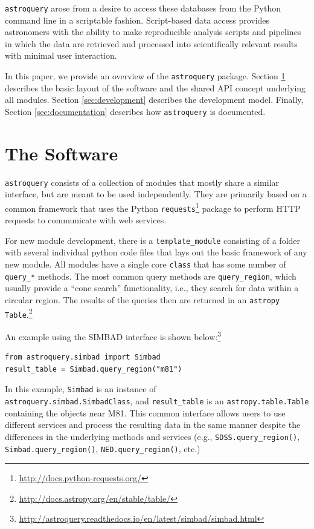 \documentclass[twocolumn]{aastex62}
\newcommand{\package}[1]{\texttt{#1}\xspace}
\newcommand{\astroquery}{\package{astroquery}}
\newcommand{\astropypkg}{\package{astropy}}
\begin{document}
\astroquery arose from a desire to access these databases from the Python
command line in a scriptable fashion.  Script-based data access provides
astronomers with the ability to make reproducible analysis scripts and
pipelines in which the data are retrieved and processed into scientifically
relevant results with minimal user interaction.

In this paper, we provide an overview of the \astroquery package.  Section
\ref{sec:software} describes the basic layout of the software and the shared
API concept underlying all modules.  Section \ref{sec:development} describes
the development model.  Finally, Section \ref{sec:documentation} describes how
\astroquery is documented.



\section{The Software}
\label{sec:software}
\astroquery consists of a collection of modules that mostly share a similar
interface, but are meant to be used independently.  They are primarily based on
a common framework that uses the Python
\package{requests}\footnote{\url{http://docs.python-requests.org/}} package to
perform HTTP requests to communicate with web services.

For new module development, there is a \texttt{template\_module} consisting of a
folder with several individual python code files that lays
out the basic framework of any new module.  All modules have a single core
\texttt{class} that has some number of \texttt{query\_*} methods.
The most common query methods are \texttt{query\_region}, which usually
provide a ``cone search'' functionality, i.e., they search for data within a
circular region. The results of
the queries then are returned in an \astropypkg
\citep{Astropy-Collaboration2018, Astropy-Collaboration2013}
\texttt{Table}.\footnote{\url{http://docs.astropy.org/en/stable/table/}}

An example using the SIMBAD interface is shown
below:\footnote{\url{http://astroquery.readthedocs.io/en/latest/simbad/simbad.html}}
\begin{lstlisting}[caption=Query SIMBAD for a region around M81]
from astroquery.simbad import Simbad
result_table = Simbad.query_region("m81")
\end{lstlisting}
In this example, \texttt{Simbad} is an instance of \\
\texttt{astroquery.simbad.SimbadClass}, and \texttt{result\_table} is an
\texttt{astropy.table.Table} containing the objects near M81.
This common interface allows users to use different services and process
the resulting data in the same manner despite the differences in the underlying
methods and services (e.g., \texttt{SDSS.query\_region()},
\texttt{Simbad.query\_region()}, \texttt{NED.query\_region()}, etc.)
\end{document}

